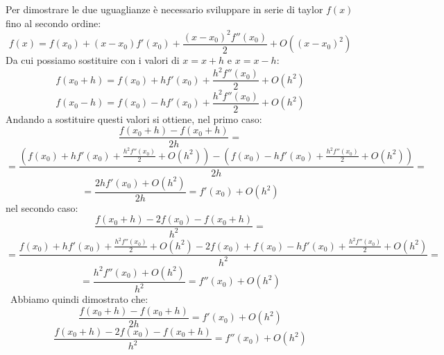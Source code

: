 Per dimostrare le due uguaglianze è necessario sviluppare in serie di taylor $f(x)$ fino al secondo ordine:
\[
f(x) = f(x_0) + (x-x_0)f'(x_0)+\frac{(x-x_0)^2f''(x_0)}{2} + O((x-x_0)^2)
\]
Da cui possiamo sostituire con i valori di $x=x+h$ e $x=x-h$:
\[
f(x_0+h)=f(x_0)+h f'(x_0)+\frac{h^2f''(x_0)}{2} + O(h^2)
\]
\[
f(x_0-h)=f(x_0)-h f'(x_0)+\frac{h^2f''(x_0)}{2} + O(h^2)
\]
Andando a sostituire questi valori si ottiene, nel primo caso:
\[
\frac{f(x_0 + h) - f(x_0 + h)}{2h} =
\]
\[
= \frac{(f(x_0)+h f'(x_0)+\frac{h^2f''(x_0)}{2} + O(h^2))-(f(x_0)-h f'(x_0)+\frac{h^2f''(x_0)}{2} + O(h^2))}{2h} = 
\]
\[
= \frac{2h f'(x_0)+O(h^2)}{2h} = f'(x_0)+O(h^2)
\]
nel secondo caso:
\[
\frac{f(x_0 + h) -2f(x_0) - f(x_0 + h)}{h^2} =
\]
\[
= \frac{f(x_0)+h f'(x_0)+\frac{h^2f''(x_0)}{2} + O(h^2) -2f(x_0) + f(x_0)-h f'(x_0)+\frac{h^2f''(x_0)}{2} + O(h^2)}{h^2} = 
\]
\[
= \frac{h^2f''(x_0)+O(h^2)}{h^2} = f''(x_0)+O(h^2)
\]
\
Abbiamo quindi dimostrato che:
\[
\frac{f(x_0 + h) - f(x_0 + h)}{2h} = f'(x_0)+O(h^2)
\]
\[
\frac{f(x_0 + h) -2f(x_0) - f(x_0 + h)}{h^2} = f''(x_0)+O(h^2)
\]